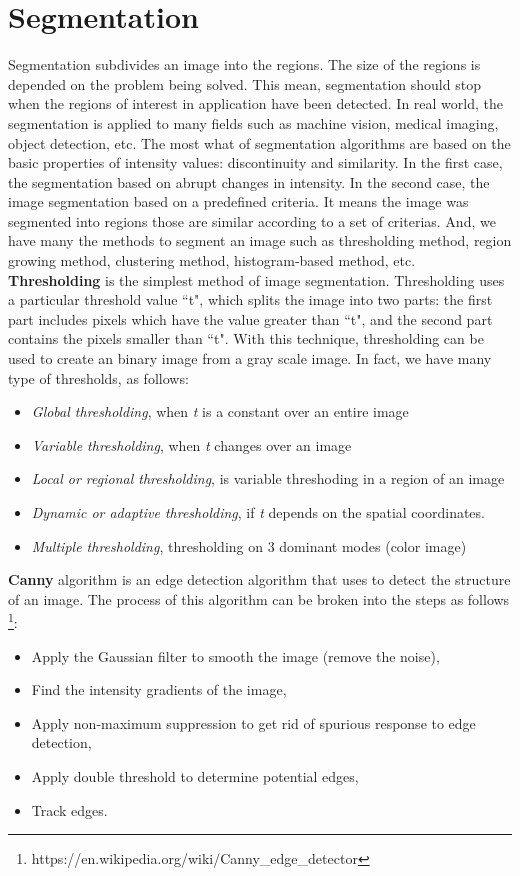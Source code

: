 \section{Segmentation}
Segmentation subdivides an image into the regions. The size of the regions is depended on the problem being solved. This mean, segmentation should stop when the regions of interest in application have been detected. In real world, the segmentation is applied to many fields such as machine vision, medical imaging, object detection, etc. The most what of segmentation algorithms are based on the basic properties of intensity values: discontinuity and similarity. In the first case, the segmentation based on abrupt changes in intensity. In the second case, the image segmentation based on a predefined criteria. It means the image was segmented into regions those are similar according to a set of criterias. And, we have many the methods to segment an image such as thresholding method, region growing method, clustering method, histogram-based method, etc.\\[0.2 cm]
\textbf{Thresholding} is the simplest method of image segmentation. Thresholding uses a particular threshold value ``t", which splits the image into two parts: the first part includes pixels which have the value greater than ``t", and the second part contains the pixels smaller than ``t". With this technique, thresholding can be used to create an binary image from a gray scale image. In fact, we have many type of thresholds, as follows:
\begin{itemize}
\item \textit{Global thresholding}, when \textit{t} is a constant over an entire image
\item \textit{Variable thresholding}, when \textit{t} changes over an image
\item \textit{Local or regional thresholding}, is variable threshoding in a region of an image
\item \textit{Dynamic or adaptive thresholding}, if \textit{t} depends on the spatial coordinates.
\item \textit{Multiple thresholding}, thresholding on 3 dominant modes (color image)
\end{itemize}
\textbf{Canny} algorithm is an edge detection algorithm that uses to detect the structure of an image. The process of this algorithm can be broken into the steps as follows \footnote{https://en.wikipedia.org/wiki/Canny\_edge\_detector}:
\begin{itemize}
\item Apply the Gaussian filter to smooth the image (remove the noise),
\item Find the intensity gradients of the image,
\item Apply non-maximum suppression to get rid of spurious response to edge detection,
\item Apply double threshold to determine potential edges,
\item Track edges.
\end{itemize}
